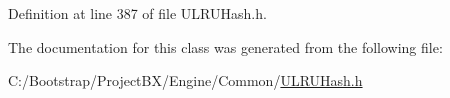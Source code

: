 Definition at line 387 of file ULRUHash.h.

The documentation for this class was generated from the following file:\begin{CompactItemize}
\item 
C:/Bootstrap/ProjectBX/Engine/Common/\hyperlink{_u_l_r_u_hash_8h}{ULRUHash.h}\end{CompactItemize}
